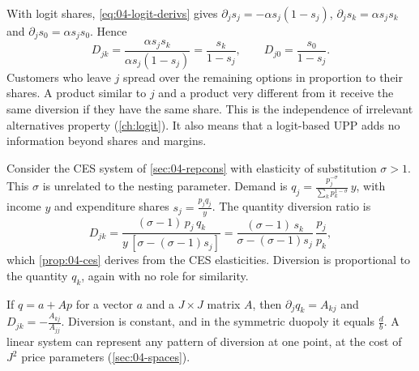 With logit shares, \eqref{eq:04-logit-derivs} gives $\partial_j s_j = -\alpha s_j(1 - s_j)$,
$\partial_j s_k = \alpha s_j s_k$ and $\partial_j s_0 = \alpha s_j s_0$. Hence
\begin{equation}\label{eq:04-diversion-logit}
  D_{jk} = \frac{\alpha s_j s_k}{\alpha s_j(1 - s_j)} = \frac{s_k}{1 - s_j}, \qquad D_{j0} = \frac{s_0}{1 - s_j}.
\end{equation}
Customers who leave $j$ spread over the remaining options in proportion to their shares. A product similar to
$j$ and a product very different from it receive the same diversion if they have the same share. This is the
independence of irrelevant alternatives property (\cref{ch:logit}). It also means that a logit-based UPP adds
no information beyond shares and margins.

Consider the CES system of \cref{sec:04-repcons} with elasticity of substitution $\sigma > 1$. This $\sigma$ is
unrelated to the nesting parameter. Demand is $q_j = \frac{p_j^{-\sigma}}{\sum_k p_k^{1-\sigma}}\,y$, with income $y$
and expenditure shares $s_j = \frac{p_jq_j}{y}$. The quantity diversion ratio is
\begin{equation}\label{eq:04-diversion-ces}
  D_{jk} = \frac{(\sigma - 1)\,p_j\,q_k}{y\,[\sigma - (\sigma - 1)s_j]} = \frac{(\sigma - 1)\,s_k}{\sigma - (\sigma - 1)s_j}\,\frac{p_j}{p_k},
\end{equation}
which \cref{prop:04-ces} derives from the CES elasticities. Diversion is proportional to the quantity $q_k$,
again with no role for similarity.

If $q = a + Ap$ for a vector $a$ and a $J \times J$ matrix $A$, then $\partial_j q_k = A_{kj}$ and
$D_{jk} = -\frac{A_{kj}}{A_{jj}}$. Diversion is constant, and in the symmetric duopoly it equals
$\frac{d}{b}$. A linear system can represent any pattern of diversion at one point, at the cost of $J^2$
price parameters (\cref{sec:04-spaces}).

